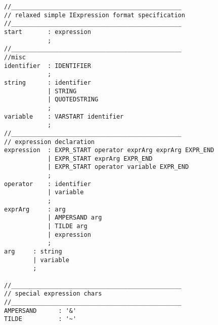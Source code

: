 \begin{verbatim}
//_______________________________________________
// relaxed simple IExpression format specification
//_______________________________________________
start		: expression			
			;
//_______________________________________________
//misc
identifier	: IDENTIFIER			
			;
string		: identifier
			| STRING				
			| QUOTEDSTRING			
			;
variable	: VARSTART identifier	
			;
//_______________________________________________
// expression declaration
expression	: EXPR_START operator exprArg exprArg EXPR_END	
			| EXPR_START exprArg EXPR_END					
			| EXPR_START operator variable EXPR_END			
			;
operator	: identifier
			| variable	
			;
exprArg		: arg
			| AMPERSAND arg	
			| TILDE arg	
			| expression
			;
arg		: string	
		| variable	
		;

//_______________________________________________
// special expression chars
//_______________________________________________
AMPERSAND      : '&'
TILDE          : '~'
\end{verbatim}
